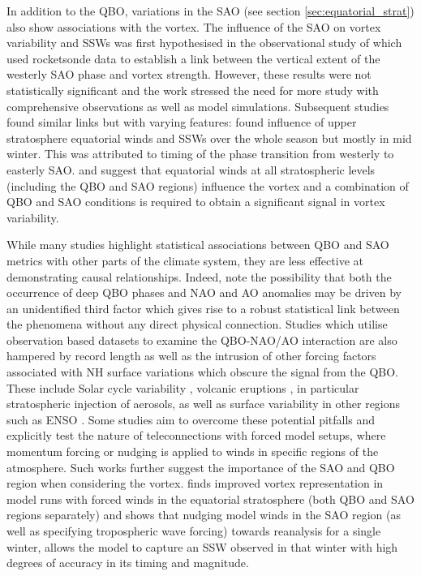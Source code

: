 In addition to the QBO, variations in the SAO (see section \ref{sec:equatorial_strat}) also show associations with the vortex. The influence of the SAO on vortex variability and SSWs was first hypothesised in the observational study of \cite{grayData2001} which used rocketsonde data to establish a link between the vertical extent of the westerly SAO phase and vortex strength. However, these results were not statistically significant and the work stressed the need for more study with comprehensive observations as well as model simulations. Subsequent studies found similar links but with varying features: \cite{grayinfluence2003} found influence of upper stratosphere equatorial winds and SSWs over the whole season but mostly in mid winter. This was attributed to timing of the phase transition from westerly to easterly SAO. \cite{grayData2001} and \cite{hamiltonEffects1998} suggest that equatorial winds at all stratospheric levels (including the QBO and SAO regions) influence the vortex and a combination of QBO and SAO conditions is required to obtain a significant signal in vortex variability.

While many studies highlight statistical associations between QBO and SAO metrics with other parts of the climate system, they are less effective at demonstrating causal relationships. Indeed, \cite{andrewsObserved2019d} note the possibility that both the occurrence of deep QBO phases and NAO and AO anomalies may be driven by an unidentified third factor which gives rise to a robust statistical link between the phenomena without any direct physical connection. Studies which utilise observation based datasets to examine the QBO-NAO/AO interaction are also hampered by record length as well as the intrusion of other forcing factors associated with NH surface variations which obscure the signal from the QBO. These include Solar cycle variability \citep{GrayElevenyear2016}, volcanic eruptions \citep{stenchikovArctic2004}, in particular stratospheric injection of aerosols, as well as surface variability in other regions such as ENSO \citep{bellStratospheric2009}. Some studies aim to overcome these potential pitfalls and explicitly test the nature of teleconnections with forced model setups, where momentum forcing or nudging is applied to winds in specific regions of the atmosphere. Such works further suggest the importance of the SAO and QBO region when considering the vortex. \cite{pascoeQuasibiennial2005b} finds improved vortex representation in model runs with forced winds in the equatorial stratosphere (both QBO and SAO regions separately) and \cite{grayForecasting2020a} shows that nudging model winds in the SAO region (as well as specifying tropospheric wave forcing) towards reanalysis for a single winter, allows the model to capture an SSW observed in that winter with high degrees of accuracy in its timing and magnitude.   


